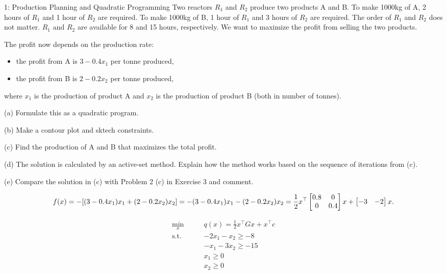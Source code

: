 
\begin{problem}{1: Production Planning and Quadratic Programming}
  Two reactors $R_1$ and $R_2$ produce two products A and B. To make 1000kg of A, 2 hours of $R_1$ and 1 hour of $R_2$ are required. 
  To make 1000kg of B, 1 hour of $R_1$ and 3 hours of $R_2$ are required. The order of $R_1$ and $R_2$ does not matter. $R_1$ and $R_2$ are available for 8 and 15 hours, respectively. 
  We want to maximize the profit from selling the two products. 

  The profit now depends on the production rate:
  \begin{itemize}
    \item the profit from A is $3-0.4x_1$ per tonne produced,
    \item the profit from B is $2-0.2x_2$ per tonne produced,
  \end{itemize}

  where $x_1$ is the production of product A and $x_2$ is the production of product B (both in number of tonnes). 
  
  \medskip (a) Formulate this as a quadratic program.
  
  \medskip (b) Make a contour plot and sktech constraints. 
  
  \medskip (c) Find the production of A and B that maximizes the total profit. 
  
  \medskip (d) The solution is calculated by an active-set method. Explain how the method works based on the sequence of iterations from (c). 
  
  \medskip (e) Compare the solution in (c) with Problem 2 (c) in Exercise 3 and comment. 

\end{problem}


\[
  f(x) = -[(3-0.4x_1)x_1 + (2-0.2x_2)x_2] = -(3-0.4x_1)x_1-(2-0.2x_2)x_2 = \frac{1}{2}x^{\top}\begin{bmatrix} 0.8 & 0 \\ 0 & 0.4 \end{bmatrix}x + \begin{bmatrix} -3 & -2 \end{bmatrix}x
.\] 


\begin{align*}
  \min_x \qquad& q(x) = \frac{1}{2}x^{\top}Gx+x^{\top}c \\ 
  \text{s.t.}\qquad & -2x_1-x_2 \geq -8 \\ 
  &-x_1-3x_2 \geq -15 \\ 
  &x_1\geq 0 \\ 
  &x_2 \geq 0
\end{align*}

